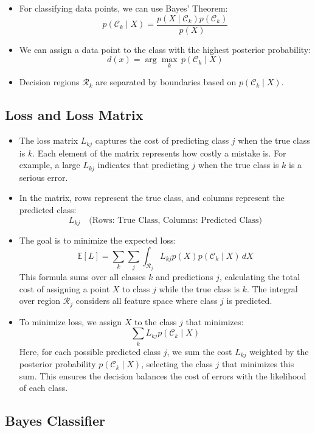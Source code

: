 \documentclass{article}
\begin{document}
\begin{itemize}
  \item For classifying data points, we can use Bayes' Theorem:
  \[
  p(\mathcal{C}_k \mid X) = \frac{p(X \mid \mathcal{C}_k) p(\mathcal{C}_k)}{p(X)}
  \]
  \item We can assign a data point to the class with the highest posterior probability:
  \[
  d(x) = \arg\max_k \, p(\mathcal{C}_k \mid X)
  \]
  \item Decision regions $\mathcal{R}_k$ are separated by boundaries based on $p(\mathcal{C}_k \mid X)$.
\end{itemize}

\subsection{Loss and Loss Matrix}

\begin{itemize}
  \item The loss matrix $L_{kj}$ captures the cost of predicting class $j$ when the true class is $k$. Each element of the matrix represents how costly a mistake is. For example, a large $L_{kj}$ indicates that predicting $j$ when the true class is $k$ is a serious error.
  \item In the matrix, rows represent the true class, and columns represent the predicted class:
  \[
  L_{kj} \quad \text{(Rows: True Class, Columns: Predicted Class)}
  \]
  \item The goal is to minimize the expected loss:
  \[
  \mathbb{E}[L] = \sum_{k} \sum_{j} \int_{\mathcal{R}_j} L_{kj} p(X) p(\mathcal{C}_k \mid X) \, dX
  \]
  This formula sums over all classes $k$ and predictions $j$, calculating the total cost of assigning a point $X$ to class $j$ while the true class is $k$. The integral over region $\mathcal{R}_j$ considers all feature space where class $j$ is predicted.
  \item To minimize loss, we assign $X$ to the class $j$ that minimizes:
  \[
  \sum_{k} L_{kj} p(\mathcal{C}_k \mid X)
  \]
  Here, for each possible predicted class $j$, we sum the cost $L_{kj}$ weighted by the posterior probability $p(\mathcal{C}_k \mid X)$, selecting the class $j$ that minimizes this sum. This ensures the decision balances the cost of errors with the likelihood of each class.
\end{itemize}

\subsection{Bayes Classifier}
\end{document}
